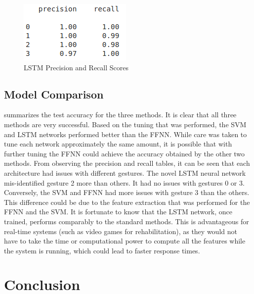 \documentclass[journal]{IEEEtran}
\begin{document}
\begin{figure}[!t]
	\centering
	\includegraphics[width=0.46\linewidth]{LSTM_prec_rec}
	\caption{LSTM Precision and Recall Scores}
	\label{fig:lstm_pr}
\end{figure}

\begingroup
\def\arraystretch{1.2}%
\setlength{\tabcolsep}{2pt} %
\begin{table}[b]
	\centering
	\caption{Final Model Comparison.}
	\label{table:final_comp}
\end{table}%
\endgroup

\subsection{Model Comparison}
 summarizes the test accuracy for the three methods. It is clear that all three methods are very successful. Based on the tuning that was performed, the SVM and LSTM networks performed better than the FFNN. While care was taken to tune each network approximately the same amount, it is possible that with further tuning the FFNN could achieve the accuracy obtained by the other two methods. From observing the precision and recall tables, it can be seen that each architecture had issues with different gestures. The novel LSTM neural network mis-identified gesture 2 more than others. It had no issues with gestures 0 or 3. Conversely, the SVM and FFNN had more issues with gesture 3 than the others. This difference could be due to the feature extraction that was performed for the FFNN and the SVM. It is fortunate to know that the LSTM network, once trained, performs comparably to the standard methods. This is advantageous for real-time systems (such as video games for rehabilitation), as they would not have to take the time or computational power to compute all the features while the system is running, which could lead to faster response times.

\section{Conclusion}
\label{sec:conclusion}














\end{document}
